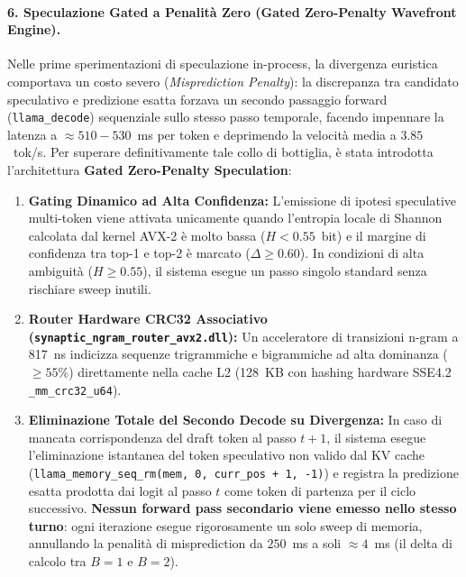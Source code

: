 \documentclass[10pt,a4paper]{article}
\theoremstyle{definition}
\begin{document}
\paragraph{6. Speculazione Gated a Penalit\`a Zero (Gated Zero-Penalty Wavefront Engine).}
Nelle prime sperimentazioni di speculazione in-process, la divergenza euristica comportava un costo severo (\emph{Misprediction Penalty}): la discrepanza tra candidato speculativo e predizione esatta forzava un secondo passaggio forward (\texttt{llama\_decode}) sequenziale sullo stesso passo temporale, facendo impennare la latenza a $\approx 510-530$~ms per token e deprimendo la velocit\`a media a $3.85$~tok/s.
Per superare definitivamente tale collo di bottiglia, \`e stata introdotta l'architettura \textbf{Gated Zero-Penalty Speculation}:
\begin{enumerate}[leftmargin=1.5em]
    \item \textbf{Gating Dinamico ad Alta Confidenza:} L'emissione di ipotesi speculative multi-token viene attivata unicamente quando l'entropia locale di Shannon calcolata dal kernel AVX-2 \`e molto bassa ($H < 0.55$~bit) e il margine di confidenza tra top-1 e top-2 \`e marcato ($\Delta \ge 0.60$). In condizioni di alta ambiguit\`a ($H \ge 0.55$), il sistema esegue un passo singolo standard senza rischiare sweep inutili.
    \item \textbf{Router Hardware CRC32 Associativo (\texttt{synaptic\_ngram\_router\_avx2.dll}):} Un acceleratore di transizioni n-gram a 817~ns indicizza sequenze trigrammiche e bigrammiche ad alta dominanza ($\ge 55\%$) direttamente nella cache L2 (128~KB con hashing hardware SSE4.2 \texttt{\_mm\_crc32\_u64}).
    \item \textbf{Eliminazione Totale del Secondo Decode su Divergenza:} In caso di mancata corrispondenza del draft token al passo $t+1$, il sistema esegue l'eliminazione istantanea del token speculativo non valido dal KV cache (\texttt{llama\_memory\_seq\_rm(mem, 0, curr\_pos + 1, -1)}) e registra la predizione esatta prodotta dai logit al passo $t$ come token di partenza per il ciclo successivo. \textbf{Nessun forward pass secondario viene emesso nello stesso turno}: ogni iterazione esegue rigorosamente un solo sweep di memoria, annullando la penalit\`a di misprediction da $250$~ms a soli $\approx 4$~ms (il delta di calcolo tra $B=1$ e $B=2$).
\end{enumerate}
\end{document}
